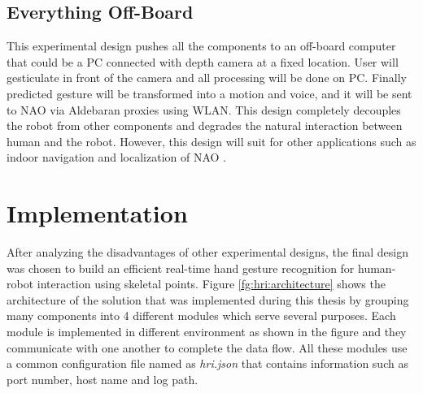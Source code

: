 

\subsection{Everything Off-Board} This experimental design pushes all the components to an off-board computer that could be a PC connected with depth camera at a fixed location. User will gesticulate in front of the camera and all processing will be done on PC. Finally predicted gesture will be transformed into a motion and voice, and it will be sent to NAO via Aldebaran proxies using WLAN. This design completely decouples the robot from other components and degrades the natural interaction between human and the robot. However, this design will suit for other applications such as indoor navigation and localization of NAO \cite{20}.

\section{Implementation} \label{sec:sol:impl} After analyzing the disadvantages of other experimental designs, the final design was chosen to build an efficient real-time hand gesture recognition for human-robot interaction using skeletal points. Figure \ref{fg:hri:architecture} shows the architecture of the solution that was implemented during this thesis by grouping many components into 4 different modules which serve several purposes. Each module is implemented in different environment as shown in the figure and they communicate with one another to complete the data flow. All these modules use a common configuration file named as \textit{hri.json} that contains information such as port number, host name and log path.




 







